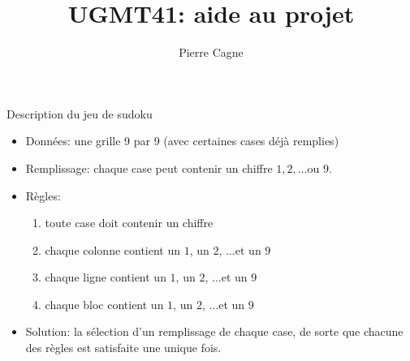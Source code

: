 \documentclass[french,10pt]{beamer}
\title{UGMT41: aide au projet}
\date{}
\author{Pierre Cagne}
\def\possible{\color{structure.fg!60!black!70}}
\def\constraint{\color{structure.fg!50!red!70}}
\def\solution{\color{red!70}}
\begin{document}
\maketitle

\begin{frame}{Description du jeu de sudoku}
  \begin{itemize}
  \item {\color{structure.fg} Données:} une grille 9 par 9 (avec
    certaines cases déjà remplies)
  \item {\possible Remplissage:} chaque case peut contenir
    un chiffre $1,2,\dots$ou $9$.
  \item {\constraint Règles:}
    \begin{enumerate}[label=\null]
    \item toute case doit contenir un chiffre
    \item chaque colonne contient un $1$, un $2$, $\dots$et un $9$
    \item chaque ligne contient un $1$, un $2$, $\dots$et un $9$
    \item chaque bloc contient un $1$, un $2$, $\dots$et un $9$
    \end{enumerate}
  \item {\solution Solution}: la sélection d'un remplissage
    de chaque case, de sorte que chacune des règles est satisfaite une
    unique fois.
  \end{itemize}
\end{frame}
\end{document}
